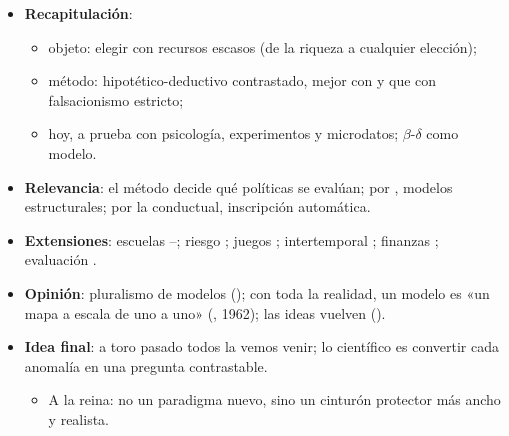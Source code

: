 \documentclass{article}
\begin{document}
\begin{columnas}
\begin{itemize}
\item \textbf{Recapitulación}:
  \begin{itemize}
  \item objeto: elegir con recursos escasos (de la riqueza a cualquier elección);
  \item método: hipotético-deductivo contrastado, mejor con  y  que con falsacionismo estricto;
  \item hoy, a prueba con psicología, experimentos y microdatos; $\beta$-$\delta$ como modelo.
  \end{itemize}
\item \textbf{Relevancia}: el método decide qué políticas se evalúan; por , modelos estructurales; por la conductual, inscripción automática.
\item \textbf{Extensiones}: escuelas --; riesgo ; juegos ; intertemporal ; finanzas ; evaluación .
\item \textbf{Opinión}: pluralismo de modelos (); con toda la realidad, un modelo es «un mapa a escala de uno a uno» (, 1962); las ideas vuelven ().
\item \textbf{Idea final}: a toro pasado todos la vemos venir; lo científico es convertir cada anomalía en una pregunta contrastable.
  \begin{itemize}
  \item A la reina: no un paradigma nuevo, sino un cinturón protector más ancho y realista.
  \end{itemize}
\end{itemize}


\end{columnas}
\end{document}
